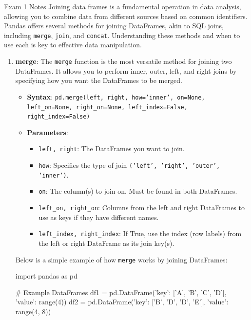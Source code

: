 \begin{examnotes}{Exam 1 Notes}
    Joining data frames is a fundamental operation in data analysis, allowing you to combine data from different sources based on common identifiers. Pandas offers several methods for joining DataFrames, 
    akin to SQL joins, including \texttt{merge}, \texttt{join}, and \texttt{concat}. Understanding these methods and when to use each is key to effective data manipulation.

    \begin{enumerate}
        \item \textbf{merge}: The \texttt{merge} function is the most versatile method for joining two DataFrames. It allows you to perform inner, outer, left, and right joins by specifying how you 
        want the DataFrames to be merged.
        \begin{itemize}
            \item \textbf{Syntax}: \scriptsize{\texttt{pd.merge(left, right, how='inner', on=None, left\_on=None, right\_on=None, left\_index=False, right\_index=False)}} \normalsize
            \item \textbf{Parameters}:
            \begin{itemize}
                \item \texttt{left, right}: The DataFrames you want to join.
                \item \texttt{how}: Specifies the type of join \texttt{('left', 'right', 'outer', 'inner')}.
                \item \texttt{on}: The column(s) to join on. Must be found in both DataFrames.
                \item \texttt{left\_on, right\_on}: Columns from the left and right DataFrames to use as keys if they have different names.
                \item \texttt{left\_index, right\_index}: If True, use the index (row labels) from the left or right DataFrame as its join key(s).
            \end{itemize}
        \end{itemize}
        \begin{highlight}
            Below is a simple example of how \texttt{merge} works by joining DataFrames:

    \begin{code}[Python]
    import pandas as pd

    # Example DataFrames
    df1 = pd.DataFrame({'key': ['A', 'B', 'C', 'D'], 'value': range(4)})
    df2 = pd.DataFrame({'key': ['B', 'D', 'D', 'E'], 'value': range(4, 8)})
    

\end{code}
\end{highlight}
\end{enumerate}
\end{examnotes}

